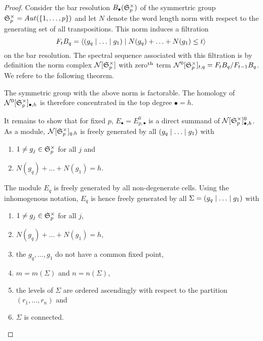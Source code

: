 \begin{proof}
\label{page:bar_resulution_of_sym_grp}%
Consider the bar resolution $B_\bullet(\mathfrak S^\times_p)$ of the symmertric group $\Symgrp^\times_p = Aut(\{1, \ldots, p\})$ and
let $N$ denote the word length norm with respect to the generating set of all transpositions.
\label{page:norm_filtration}%
This norm induces a filtration
\[
    F_tB_q = \langle \inhomq[g] \mid N(g_q) + \ldots + N(g_1) \le t \rangle \,
\]
on the bar resolution.
\label{page:norm_complex}%
The spectral sequence associated with this filtration is by definition the norm complex $\mathcal N[\mathfrak S^\times_p]$ with zero$^{\text{th}}$ term $\mathcal N^0[\mathfrak S^\times_p]_{t,q} = F_tB_q / F_{t-1}B_q$.
We refere to the following theorem.
\begin{thm}
    The symmetric group with the above norm is factorable.
    The homology of $\mathcal N^0[\mathfrak S^\times_p]_{\bullet,h}$ is therefore concentrated in the top degree $\bullet = h$.
\end{thm}

It remains to show that for fixed $p$, $E_\bullet = E^0_{p,\bullet}$ is a direct summand of $\mathcal N[\mathfrak S^\times_p]^0_{\bullet,h}$.
As a module, $\mathcal N[\mathfrak S^\times_p]_{q,h}$ is freely generated by all $\inhomq[g]$ with
\begin{enumerate}
    \item \label{cellular_models:ehrenfried:cells_in_norm_complex:non_trivial}$1 \neq g_j \in \mathfrak S^\times_p$ for all $j$ and
    \item \label{cellular_models:ehrenfried:cells_in_norm_complex:norm}$N(g_q) + \ldots + N(g_1) = h$.
\end{enumerate}
The module $E_q$ is freely generated by all non-degenerate cells.
Using the inhomogenous notation, 
$E_q$ is hence freely generated by all $\Sigma = \inhomq[g]$ with
\begin{enumerate}
    \item $1 \neq g_j \in \mathfrak S^\times_p$ for all $j$,
    \item $N(g_q) + \ldots + N(g_1) = h$,
    \item the $g_q, \ldots, g_1$ do not have a common fixed point,
    \item $m = m(\Sigma)$ and $n = n(\Sigma)$,
    \item the levels of $\Sigma$ are ordered ascendingly with respect to the partition $(r_1, \ldots, r_n)$ and
    \item $\Sigma$ is connected.
\end{enumerate}


\end{proof}
